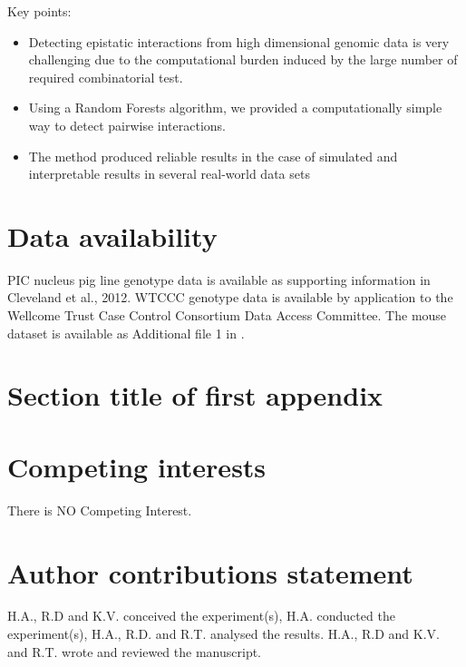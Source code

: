 \documentclass[authoryear,preprint,12pt,3p]{elsarticle}
\begin{document}
Key points:
\begin{itemize}
\item Detecting epistatic interactions from high dimensional genomic data is very challenging due to the computational
  burden induced by the large number of required combinatorial test.
\item Using a Random Forests algorithm, we provided a computationally simple way to detect pairwise interactions.
\item The method produced reliable results in the case of simulated and interpretable results in several real-world
  data sets
\end{itemize}




\section{Data availability}
PIC nucleus pig line genotype data is available as supporting information in Cleveland et al., 2012. WTCCC genotype data
is available by application to the Wellcome Trust Case Control Consortium Data Access Committee. The mouse dataset is
available as Additional file 1 in \cite{martiniGenomicPredictionEpistasis2017}.




\FloatBarrier
\section{Section title of first appendix}\label{sec11}







\section{Competing interests}
There is NO Competing Interest.

\section{Author contributions statement}
H.A., R.D and K.V. conceived the experiment(s), H.A. conducted
the experiment(s), H.A., R.D. and R.T. analysed the results.  H.A., R.D and K.V. and R.T.  wrote and reviewed the manuscript.
\end{document}
